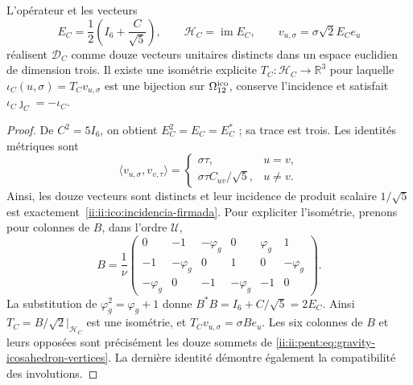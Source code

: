 \begin{proposition}
\label{ii:ii:ico:realizacion-firmada}
L'opérateur et les vecteurs
\begin{equation}
 E_C=\frac12\left(I_6+\frac C{\sqrt5}\right),\qquad
 \mathcal H_C=\operatorname{im}E_C,\qquad
 v_{u,\sigma}=\sigma\sqrt2 E_Ce_u
 \label{ii:ii:ico:proyector-seis}
\end{equation}
réalisent \(\mathcal D_C\) comme douze vecteurs unitaires distincts dans un
espace euclidien de dimension trois. Il existe une isométrie explicite
\(T_C:\mathcal H_C\to\mathbb R^3\) pour laquelle
\(\iota_C(u,\sigma)=T_Cv_{u,\sigma}\) est une bijection sur
\(\Omega_{12}^{\rm ico}\), conserve l'incidence et satisfait
\(\iota_C\jmath_C=-\iota_C\).
\end{proposition}
\begin{proof}
De \(C^2=5I_6\), on obtient \(E_C^2=E_C=E_C^*\) ; sa trace est trois.
Les identités métriques sont
\[
 \langle v_{u,\sigma},v_{v,\tau}\rangle
 =\begin{cases}\sigma\tau,&u=v,\\
 \sigma\tau C_{uv}/\sqrt5,&u\ne v.
 \end{cases}
\]
Ainsi, les douze vecteurs sont distincts et leur incidence de produit scalaire
\(1/\sqrt5\) est exactement~\eqref{ii:ii:ico:incidencia-firmada}.
Pour expliciter l'isométrie, prenons pour colonnes de \(B\), dans l'ordre
\(\mathcal U\),
\[
 B=\frac1\nu
 \begin{pmatrix}
 0&-1&-\varphi_g&0&\varphi_g&1\\
 -1&-\varphi_g&0&1&0&-\varphi_g\\
 -\varphi_g&0&-1&-\varphi_g&-1&0
 \end{pmatrix}.
\]
La substitution de \(\varphi_g^2=\varphi_g+1\) donne
\(B^*B=I_6+C/\sqrt5=2E_C\). Ainsi
\(T_C=B/\sqrt2\big|_{\mathcal H_C}\) est une isométrie, et
\(T_Cv_{u,\sigma}=\sigma Be_u\). Les six colonnes de \(B\) et leurs
opposées sont précisément les douze sommets de
\eqref{ii:ii:pent:eq:gravity-icosahedron-vertices}. La dernière identité
démontre également la compatibilité des involutions.
\end{proof}

